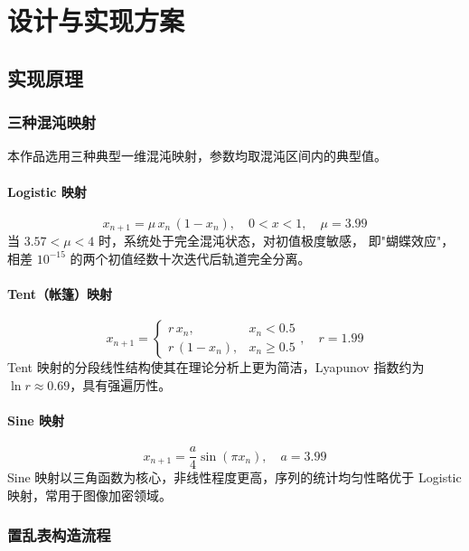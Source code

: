 \documentclass[12pt, a4paper]{article}
\begin{document}
\section{设计与实现方案}

\subsection{实现原理}

\subsubsection{三种混沌映射}

本作品选用三种典型一维混沌映射，参数均取混沌区间内的典型值。

\paragraph{Logistic 映射}
\begin{equation}
  x_{n+1} = \mu\, x_n\,(1 - x_n),\quad 0 < x < 1,\quad \mu = 3.99
\end{equation}
当 $3.57 < \mu < 4$ 时，系统处于完全混沌状态，对初值极度敏感，
即"蝴蝶效应"，相差 $10^{-15}$ 的两个初值经数十次迭代后轨道完全分离。

\paragraph{Tent（帐篷）映射}
\begin{equation}
  x_{n+1} =
  \begin{cases}
    r\, x_n,       & x_n < 0.5 \\
    r\,(1 - x_n),  & x_n \geq 0.5
  \end{cases},\quad r = 1.99
\end{equation}
Tent 映射的分段线性结构使其在理论分析上更为简洁，Lyapunov 指数约为
$\ln r \approx 0.69$，具有强遍历性。

\paragraph{Sine 映射}
\begin{equation}
  x_{n+1} = \frac{a}{4}\sin(\pi x_n),\quad a = 3.99
\end{equation}
Sine 映射以三角函数为核心，非线性程度更高，序列的统计均匀性略优于
Logistic 映射，常用于图像加密领域。

\subsubsection{置乱表构造流程}
\end{document}
